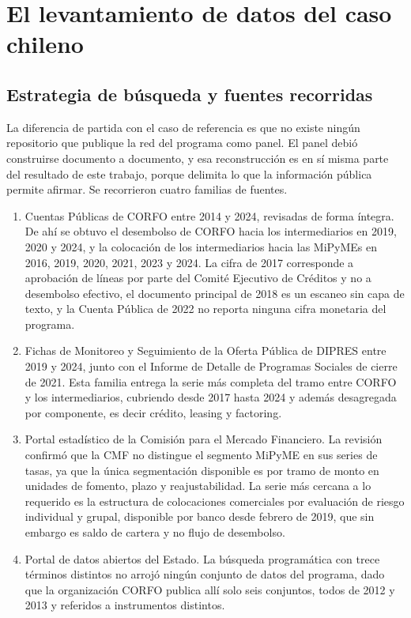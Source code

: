 \section{El levantamiento de datos del caso chileno}
\label{c4:levantamiento}

\subsection{Estrategia de búsqueda y fuentes recorridas}
\label{c4:levantamiento-fuentes}

La diferencia de partida con el caso de referencia es que no existe ningún repositorio que publique la red del programa como panel. El panel debió construirse documento a documento, y esa reconstrucción es en sí misma parte del resultado de este trabajo, porque delimita lo que la información pública permite afirmar. Se recorrieron cuatro familias de fuentes.

\begin{enumerate}
    \item Cuentas Públicas de CORFO entre 2014 y 2024, revisadas de forma
    íntegra. De ahí se obtuvo el desembolso de CORFO hacia los intermediarios en
    2019, 2020 y 2024, y la colocación de los intermediarios hacia las MiPyMEs en
    2016, 2019, 2020, 2021, 2023 y 2024. La cifra de 2017 corresponde a
    aprobación de líneas por parte del Comité Ejecutivo de Créditos y no a
    desembolso efectivo, el documento principal de 2018 es un escaneo sin capa de
    texto, y la Cuenta Pública de 2022 no reporta ninguna cifra monetaria del
    programa.
    \item Fichas de Monitoreo y Seguimiento de la Oferta Pública de DIPRES entre
    2019 y 2024, junto con el Informe de Detalle de Programas Sociales de cierre
    de 2021. Esta familia entrega la serie más completa del tramo entre CORFO y
    los intermediarios, cubriendo desde 2017 hasta 2024 y además desagregada por
    componente, es decir crédito, leasing y factoring.
    \item Portal estadístico de la Comisión para el Mercado Financiero. La
    revisión confirmó que la CMF no distingue el segmento MiPyME en sus series de
    tasas, ya que la única segmentación disponible es por tramo de monto en
    unidades de fomento, plazo y reajustabilidad. La serie más cercana a lo
    requerido es la estructura de colocaciones comerciales por evaluación de
    riesgo individual y grupal, disponible por banco desde febrero de 2019, que
    sin embargo es saldo de cartera y no flujo de desembolso.
    \item Portal de datos abiertos del Estado. La búsqueda programática con trece
    términos distintos no arrojó ningún conjunto de datos del programa, dado que
    la organización CORFO publica allí solo seis conjuntos, todos de 2012 y 2013 y
    referidos a instrumentos distintos.
\end{enumerate}

